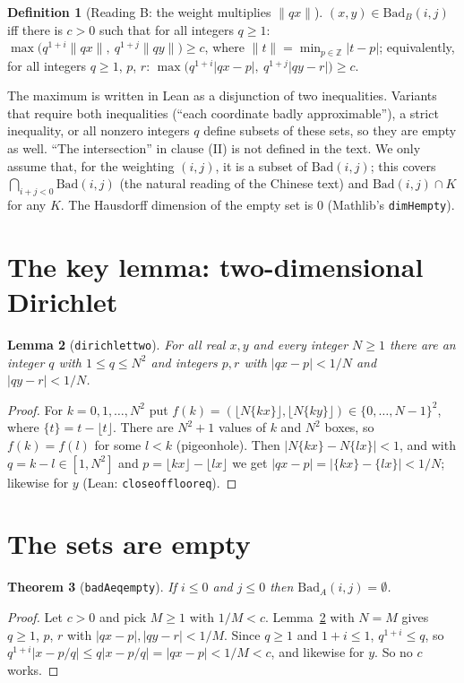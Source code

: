 \documentclass[11pt]{article}
\newtheorem{theorem}{Theorem}
\newtheorem{lemma}[theorem]{Lemma}
\theoremstyle{definition}
\newtheorem{definition}[theorem]{Definition}
\theoremstyle{remark}
\renewcommand{\_}{\oldus\allowbreak}
\newcommand{\BadA}{\mathrm{Bad}_A}
\newcommand{\BadB}{\mathrm{Bad}_B}
\begin{document}
\begin{definition}[Reading B: the weight multiplies $\|qx\|$]
$(x,y)\in\BadB(i,j)$ iff there is $c>0$ such that for all integers $q\ge 1$:
$\max\bigl(q^{1+i}\|qx\|,\ q^{1+j}\|qy\|\bigr)\ge c$, where $\|t\|=\min_{p\in\mathbb{Z}}|t-p|$; equivalently,
for all integers $q\ge1$, $p$, $r$: $\max\bigl(q^{1+i}|qx-p|,\ q^{1+j}|qy-r|\bigr)\ge c$.
\end{definition}

The maximum is written in Lean as a disjunction of two inequalities. Variants that require both inequalities
(``each coordinate badly approximable''), a strict inequality, or all nonzero integers $q$ define subsets of
these sets, so they are empty as well.  ``The intersection'' in clause (II) is not defined in the text. We
only assume that, for the weighting $(i,j)$, it is a subset of $\mathrm{Bad}(i,j)$; this covers
$\bigcap_{i+j<0}\mathrm{Bad}(i,j)$ (the natural reading of the Chinese text) and $\mathrm{Bad}(i,j)\cap K$ for any $K$.
The Hausdorff dimension of the empty set is $0$ (Mathlib's \texttt{dimH\_empty}).

\section{The key lemma: two-dimensional Dirichlet}

\begin{lemma}[\texttt{dirichlet\_two}]\label{lem:dir}
For all real $x,y$ and every integer $N\ge1$ there are an integer $q$ with $1\le q\le N^2$ and integers $p,r$
with $|qx-p|<1/N$ and $|qy-r|<1/N$.
\end{lemma}
\begin{proof}
For $k=0,1,\dots,N^2$ put $f(k)=(\lfloor N\{kx\}\rfloor,\lfloor N\{ky\}\rfloor)\in\{0,\dots,N-1\}^2$, where
$\{t\}=t-\lfloor t\rfloor$. There are $N^2+1$ values of $k$ and $N^2$ boxes, so $f(k)=f(l)$ for some $l<k$
(pigeonhole). Then $|N\{kx\}-N\{lx\}|<1$, and with $q=k-l\in[1,N^2]$ and
$p=\lfloor kx\rfloor-\lfloor lx\rfloor$ we get $|qx-p|=|\{kx\}-\{lx\}|<1/N$; likewise for $y$
(Lean: \texttt{close\_of\_floor\_eq}).
\end{proof}

\section{The sets are empty}

\begin{theorem}[\texttt{badA\_eq\_empty}]
If $i\le 0$ and $j\le 0$ then $\BadA(i,j)=\emptyset$.
\end{theorem}
\begin{proof}
Let $c>0$ and pick $M\ge1$ with $1/M<c$. Lemma~\ref{lem:dir} with $N=M$ gives $q\ge1$, $p$, $r$ with
$|qx-p|,|qy-r|<1/M$. Since $q\ge1$ and $1+i\le 1$, $q^{1+i}\le q$, so
$q^{1+i}|x-p/q|\le q|x-p/q|=|qx-p|<1/M<c$, and likewise for $y$. So no $c$ works.
\end{proof}
\end{document}
